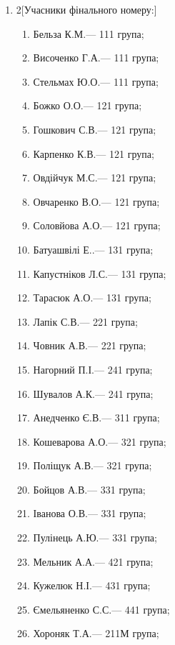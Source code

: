 \documentclass[
	a4paper,
	12pt,
	oneside,
	draft
]{extreport}
\begin{document}
\begin{enumerate}[topsep=0pt,itemsep=-1ex,partopsep=0ex,parsep=1ex]
\item 
\begin{multicols}{2}[Учасники фінального номеру:] 
\begin{enumerate}[topsep=0pt,itemsep=-1ex,partopsep=0ex,parsep=1ex,label=\arabic*.]
\item Бельза К.М.\hfill --- 111 група;
\item Височенко Г.А.\hfill --- 111 група;
\item Стельмах Ю.О.\hfill --- 111 група;
\item Божко О.О.\hfill --- 121 група;
\item Гошкович С.В.\hfill --- 121 група;
\item Карпенко К.В.\hfill --- 121 група;
\item Овдійчук М.С.\hfill --- 121 група;
\item Овчаренко В.О.\hfill --- 121 група;
\item Соловйова А.О.\hfill --- 121 група;
\item Батуашвілі Е..\hfill --- 131 група;
\item Капустніков Л.С.\hfill --- 131 група;
\item Тарасюк А.О.\hfill --- 131 група;
\item Лапік С.В.\hfill --- 221 група;
\item Човник А.В.\hfill --- 221 група;
\item Нагорний П.І.\hfill --- 241 група;
\item Шувалов А.К.\hfill --- 241 група;
\item Анедченко Є.В.\hfill --- 311 група;
\item Кошеварова А.О.\hfill --- 321 група;
\item Поліщук А.В.\hfill --- 321 група;
\item Бойцов А.В.\hfill --- 331 група;
\item Іванова О.В.\hfill --- 331 група;
\item Пулінець А.Ю.\hfill --- 331 група;
\item Мельник А.А.\hfill --- 421 група;
\item Кужелюк Н.І.\hfill --- 431 група;
\item Ємельяненко С.С.\hfill --- 441 група;
\item Хороняк Т.А.\hfill --- 211М група;
\end{enumerate}
\end{multicols}




\end{enumerate}
\end{document}
